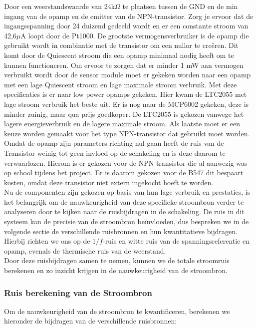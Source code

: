 Door een weerstandswaarde van 24k$\Omega$ te plaatsen tussen de GND en de min ingang van de opamp en de emitter van de NPN-transistor. Zorg je ervoor dat de ingangsspanning door 24 duizend gedeeld wordt en er een constante stroom van 42,6$\mu$A loopt door de Pt1000. De grootste vermogensverbruiker is de opamp die gebruikt wordt in combinatie met de transistor om een nullor te creëren. Dit komt door de Quiescent stroom die een opamp minimaal nodig heeft om te kunnen functioneren. Om ervoor te zorgen dat er minder 1 mW aan vermogen verbruikt wordt door de sensor module moet er gekeken worden naar een opamp met een lage Quiescent stroom en lage maximale stroom verbruik. Met deze specificaties is er naar low power opamps gekeken. Hier kwam de LTC2055 \cite{LTC2055} met lage stroom verbruik het beste uit. Er is nog naar de MCP6002 \cite{MCP6002} gekeken, deze is minder zuinig, maar qua prijs goedkoper. De LTC2055 is gekozen vanwege het lagere energieverbruik en de lagere maximale stroom. Als laatste moet er een keuze worden gemaakt voor het type NPN-transistor dat gebruikt moet worden. Omdat de opamp zijn parameters richting nul gaan heeft de ruis van de Transistor weinig tot geen invloed op de schakeling en is deze daarom te verwaarlozen. Hierom is er gekozen voor de NPN-transistor die al aanwezig was op school tijdens het project. Er is daarom gekozen voor de B547 \cite{B547} dit bespaart kosten, omdat deze transistor niet extern ingekocht hoeft te worden.
\\
\newline
Nu de componenten zijn gekozen op basis van hun lage verbruik en prestaties, is het belangrijk om de nauwkeurigheid van deze specifieke stroombron verder te analyseren door te kijken naar de ruisbijdragen in de schakeling. De ruis in dit systeem kan de precisie van de stroombron beïnvloeden, dus bespreken we in de volgende sectie de verschillende ruisbronnen en hun kwantitatieve bijdragen. Hierbij richten we ons op de \(1/f\)-ruis en witte ruis van de spanningsreferentie en opamp, evenals de thermische ruis van de weerstand.
\\
\newline
Door deze ruisbijdragen samen te nemen, kunnen we de totale stroomruis berekenen en zo inzicht krijgen in de nauwkeurigheid van de stroombron.

\subsubsection{Ruis berekening van de Stroombron}
Om de nauwkeurigheid van de stroombron te kwantificeren, berekenen we hieronder de bijdragen van de verschillende ruisbronnen:

